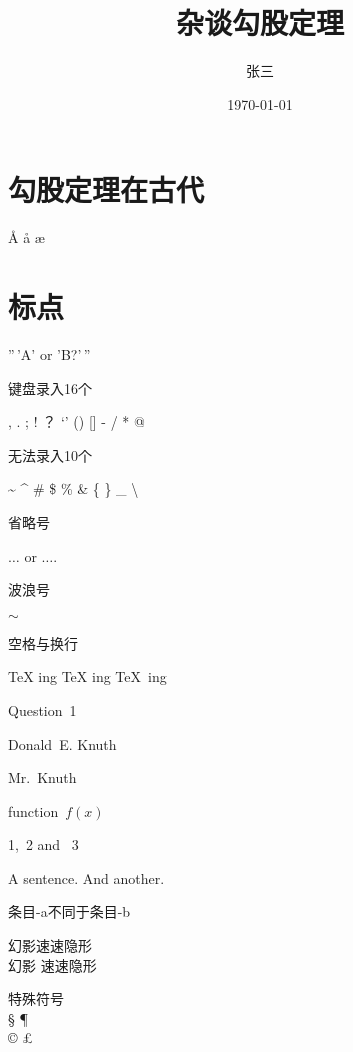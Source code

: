 \documentclass[UTF8]{ctexart}
\title{杂谈勾股定理}
\author{张三}
\date{\today}
\begin{document}
\maketitle
\tableofcontents

\section{勾股定理在古代}
\AA{} \aa{} \ae

\section{标点}
''\,'A' or 'B?'\,''

键盘录入16个

, . ; ! ？  ‘\quad’ (\quad) [\quad] - / * @

无法录入10个

\~{} \quad \^{} \quad
\# \quad \$ \quad \% \quad \& \quad 
\{ \quad \} \quad \_ \quad
\textbackslash

省略号

$\ldots$ or $\dots$.

波浪号

$\sim$

空格与换行

\TeX{} ing {\TeX} ing \TeX\ ing

Question~1 %

Donald~E. Knuth %

Mr.~Knuth

function~$f(x)$

1,~2 and ~3

A sentence. And another.

\mbox{条目}-a不同于条目-b

幻影\phantom{参数}速速隐形\\
幻影\linebreak    %
速速隐形

特殊符号\\
\S{} \dag{} \ddag{} \P \\
\copyright{} \textregistered{} \texttrademark{} \pounds \\
\textbullet
\end{document}
